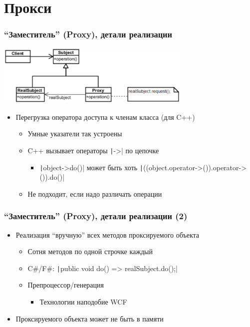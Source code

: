 \documentclass[xetex,mathserif,serif]{beamer}
\begin{document}
    \section{Прокси}

    \begin{frame}
        \frametitle{``Заместитель'' (Proxy), детали реализации}
        \begin{center}
            \includegraphics[width=0.7\textwidth]{proxy.png}
        \end{center}
        \begin{itemize}
            \item Перегрузка оператора доступа к членам класса (для C++)
            \begin{itemize}
                \item Умные указатели так устроены
                \item C++ вызывает операторы \texttt|->| по цепочке
                \begin{itemize}
                    \item \texttt|object->do()| может быть хоть \texttt|((object.operator->()).operator->()).do()|
                \end{itemize}
                \item Не подходит, если надо различать операции
            \end{itemize}
        \end{itemize}
    \end{frame}

    \begin{frame}
        \frametitle{``Заместитель'' (Proxy), детали реализации (2)}
        \begin{itemize}
            \item Реализация ``вручную'' всех методов проксируемого объекта
            \begin{itemize}
                \item Сотня методов по одной строчке каждый
                \item C\#/F\#: \texttt|public void do() => realSubject.do();|
                \item Препроцессор/генерация
                \begin{itemize}
                    \item Технологии наподобие WCF
                \end{itemize}
            \end{itemize}
            \item Проксируемого объекта может не быть в памяти
        \end{itemize}
    \end{frame}
\end{document}
